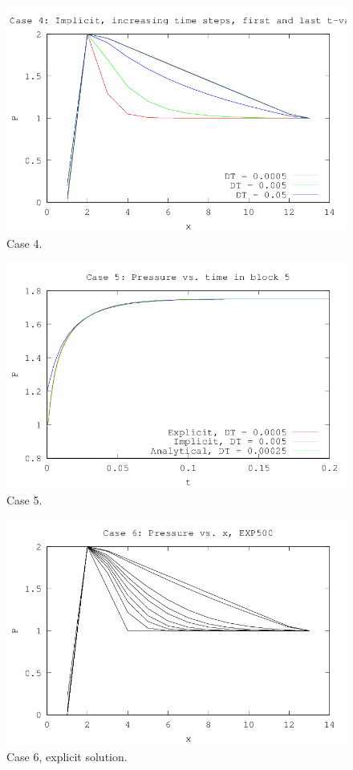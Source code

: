\begin{figure}[H]
  \centering
  \includegraphics[]{../code/case4.png}
  \caption{Case 4.}
  \label{fig:case4}
\end{figure}

\begin{figure}[H]
  \centering
  \includegraphics[]{../code/case5.png}
  \caption{Case 5.}
  \label{fig:case5}
\end{figure}

\begin{figure}[H]
  \centering
  \includegraphics[]{../code/case61.png}
  \caption{Case 6, explicit solution.}
  \label{fig:case61}
\end{figure}

